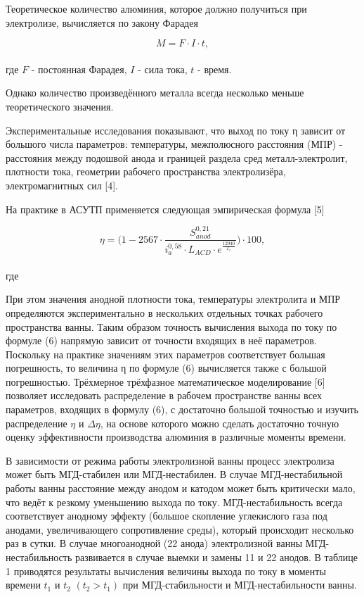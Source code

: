 \documentclass{article}
\begin{document}
Теоретическое количество алюминия, которое должно получиться при электролизе, вычисляется по закону Фарадея

\[ M = F \cdot I \cdot t, \]
\\
где $F$ - постоянная Фарадея, $I$ - сила тока, $t$ - время.

Однако количество произведённого металла всегда несколько меньше теоретического значения.

Экспериментальные исследования показывают, что выход по току η зависит от большого числа параметров: температуры, межполюсного расстояния (МПР) - расстояния между подошвой анода и границей раздела сред металл-электролит, плотности тока, геометрии рабочего пространства электролизёра, электромагнитных сил [4].

На практике в АСУТП применяется следующая эмпирическая формула [5] 

\[ \eta = \bigg(1-2567 \cdot \frac{S^{0,21}_{anod}}{i^{0,58}_{a}\cdot L_{ACD} \cdot e^{\frac{12940}{T_e}}}\bigg) \cdot 100, \]
\\
где 

При этом значения анодной плотности тока, температуры электролита и МПР определяются экспериментально в нескольких отдельных точках рабочего пространства ванны.
Таким образом точность вычисления выхода по току по формуле (6) напрямую зависит от точности входящих в неё параметров. Поскольку на практике значениям этих параметров соответствует большая погрешность, то величина η по формуле (6) вычисляется также с большой погрешностью. Трёхмерное трёхфазное математическое моделирование [6] позволяет исследовать распределение в рабочем пространстве ванны всех параметров, входящих в формулу (6), с достаточно большой точностью и изучить распределение $\eta$ и $\Delta\eta$, на основе которого можно сделать достаточно точную оценку эффективности производства алюминия в различные моменты времени.

В зависимости от режима работы электролизной ванны процесс электролиза может быть МГД-стабилен или МГД-нестабилен. В случае МГД-нестабильной работы ванны расстояние между анодом и катодом может быть критически мало, что ведёт к резкому уменьшению выхода по току. МГД-нестабильность всегда соответствует анодному эффекту (большое скопление углекислого газа под анодами, увеличивающего сопротивление среды), который происходит несколько раз в сутки. В случае многоанодной (22 анода) электролизной ванны МГД-нестабильность развивается в случае выемки и замены 11 и 22 анодов. В таблице 1 приводятся результаты вычисления величины выхода по току в моменты времени $t_1$ и $t_2$ $(t_2>t_1)$ при МГД-стабильности и МГД-нестабильности ванны. 
\end{document}
